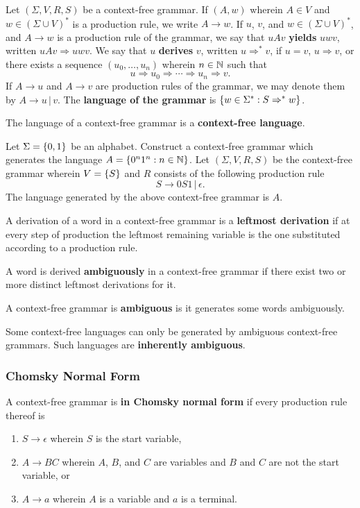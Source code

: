 Let \((\Sigma, V, R, S)\) be a context-free grammar. If \((A, w)\) wherein \(A
\in V\) and \(w \in (\Sigma \cup V)^*\) is a production rule, we write \(A \to
w\). If \(u\), \(v\), and \(w \in (\Sigma \cup V)^*\), and \(A \to w\) is a
production rule of the grammar, we say that \(u A v\) {\bf yields} \(u w v\),
written \(u A v \Rightarrow u w v\). We say that \(u\) {\bf derives} \(v\),
written \(u \Rightarrow^* v\), if \(u = v\), \(u \Rightarrow v\), or there
exists a sequence \((u_0, \ldots, u_n)\) wherein \(n \in \mathbb{N}\) such that
\[
    u \Rightarrow u_0 \Rightarrow \cdots \Rightarrow u_n \Rightarrow v.
\]
If \(A \to u\) and \(A \to v\) are production rules of the grammar, we may
denote them by \(A \to u \, | \, v\). The {\bf language of the grammar} is
\(\{w \in \Sigma^* : S \Rightarrow^* w\}\).

The language of a context-free grammar is a {\bf context-free language}.

\Bxr
    Let \(\Sigma = \{0, 1\}\) be an alphabet. Construct a context-free grammar
    which generates the language \(A = \{0^n 1^n : n \in \mathbb{N}\}\).
\Exr
\Bsl
    Let \((\Sigma, V, R, S)\) be the context-free grammar wherein \(V =
    \{S\}\) and \(R\) consists of the following production rule
    \[
        S \to 0 S 1 \, | \, \epsilon.
    \]
    The language generated by the above context-free grammar is \(A\).
\Esl

A derivation of a word in a context-free grammar is a {\bf leftmost derivation}
if at every step of production the leftmost remaining variable is the one
substituted according to a production rule.

\Bdf
    A word is derived {\bf ambiguously} in a context-free grammar if there exist
    two or more distinct leftmost derivations for it.

    A context-free grammar is {\bf ambiguous} is it generates some words
    ambiguously.
\Edf

Some context-free languages can only be generated by ambiguous context-free
grammars. Such languages are {\bf inherently ambiguous}.

\subsubsection{Chomsky Normal Form}

\Bdf
    A context-free grammar is {\bf in Chomsky normal form} if every production
    rule thereof is
    \begin{enumerate}
        \item \(S \to \epsilon\) wherein \(S\) is the start variable,
        \item \(A \to B C\) wherein \(A\), \(B\), and \(C\) are variables and
        \(B\) and \(C\) are not the start variable, or
        \item \(A \to a\) wherein \(A\) is a variable and \(a\) is a terminal.
    \end{enumerate}
\Edf

